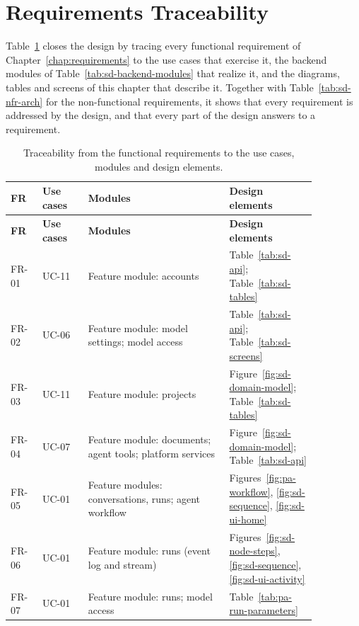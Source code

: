 \section{Requirements Traceability}
\label{sec:sd-traceability-matrix}

Table~\ref{tab:sd-req-trace} closes the design by tracing every functional requirement of Chapter~\ref{chap:requirements} to the use cases that exercise it, the backend modules of Table~\ref{tab:sd-backend-modules} that realize it, and the diagrams, tables and screens of this chapter that describe it. Together with Table~\ref{tab:sd-nfr-arch} for the non-functional requirements, it shows that every requirement is addressed by the design, and that every part of the design answers to a requirement.

\begingroup{}
\begin{longtable}{|p{0.09\linewidth}|p{0.13\linewidth}|p{0.40\linewidth}|p{0.24\linewidth}|}
    \caption{Traceability from the functional requirements to the use cases, modules and design elements.}
    \label{tab:sd-req-trace} \\
    \hline
    \textbf{FR} & \textbf{Use cases} & \textbf{Modules} & \textbf{Design elements} \\
    \hline
    \endfirsthead
    \hline
    \textbf{FR} & \textbf{Use cases} & \textbf{Modules} & \textbf{Design elements} \\
    \hline
    \endhead
    FR-01 & UC-11 & Feature module: accounts & Table~\ref{tab:sd-api}; Table~\ref{tab:sd-tables} \\ \hline
    FR-02 & UC-06 & Feature module: model settings; model access & Table~\ref{tab:sd-api}; Table~\ref{tab:sd-screens} \\ \hline
    FR-03 & UC-11 & Feature module: projects & Figure~\ref{fig:sd-domain-model}; Table~\ref{tab:sd-tables} \\ \hline
    FR-04 & UC-07 & Feature module: documents; agent tools; platform services & Figure~\ref{fig:sd-domain-model}; Table~\ref{tab:sd-api} \\ \hline
    FR-05 & UC-01 & Feature modules: conversations, runs; agent workflow & Figures~\ref{fig:pa-workflow}, \ref{fig:sd-sequence}, \ref{fig:sd-ui-home} \\ \hline
    FR-06 & UC-01 & Feature module: runs (event log and stream) & Figures~\ref{fig:sd-node-steps}, \ref{fig:sd-sequence}, \ref{fig:sd-ui-activity} \\ \hline
    FR-07 & UC-01 & Feature module: runs; model access & Table~\ref{tab:pa-run-parameters} \\ \hline

\end{longtable}
